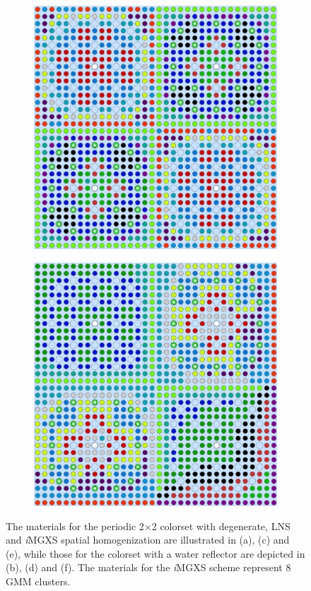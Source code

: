\documentclass[12pt,twoside]{mitthesis-exec}
\begin{document}
\begin{figure}[h!]
\begin{subfigure}{0.47\textwidth}
  \label{fig:reflector-lns}
\end{subfigure}
\begin{subfigure}{0.47\textwidth}
  \centering
  \includegraphics[width=0.85\linewidth]{figures/unsupervised/geometries/with-features/8-clusters/combined/2x2}
  \caption{}
  \label{fig:2x2-8-clusters}
\end{subfigure}%
\begin{subfigure}{0.47\textwidth}
  \centering
  \includegraphics[width=0.85\linewidth]{figures/unsupervised/geometries/with-features/8-clusters/combined/reflector}
  \caption{}
  \label{fig:reflector-8-clusters}
\end{subfigure}
\caption[Materials for the 2$\times$2 colorsets]{The materials for the periodic 2$\times$2 colorset with degenerate, LNS and \textit{i}MGXS spatial homogenization are illustrated in (a), (c) and (e), while those for the colorset with a water reflector are depicted in (b), (d) and (f). The materials for the \textit{i}MGXS scheme represent 8 GMM clusters.}
\label{fig:colorset-geometries}
\end{figure}
\end{document}
